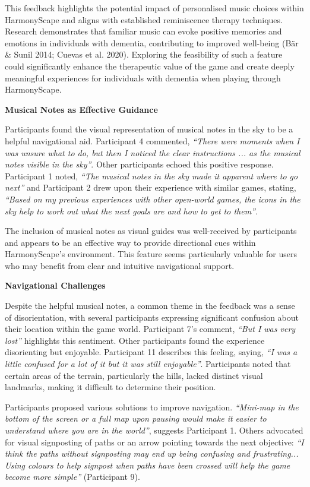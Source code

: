 \documentclass{l4proj}
\begin{document}
This feedback highlights the potential impact of personalised music choices within HarmonyScape and aligns with established reminiscence therapy techniques. Research demonstrates that familiar music can evoke positive memories and emotions in individuals with dementia, contributing to improved well-being (Bär \& Sunil 2014; Cuevas et al. 2020). Exploring the feasibility of such a feature could significantly enhance the therapeutic value of the game and create deeply meaningful experiences for individuals with dementia when playing through HarmonyScape.
\newline

\textbf{Musical Notes as Effective Guidance}

Participants found the visual representation of musical notes in the sky to be a helpful navigational aid. Participant 4 commented, \emph{“There were moments when I was unsure what to do, but then I noticed the clear instructions ... as the musical notes visible in the sky”}. Other participants echoed this positive response. Participant 1 noted, \emph{“The musical notes in the sky made it apparent where to go next”} and Participant 2 drew upon their experience with similar games, stating, \emph{“Based on my previous experiences with other open-world games, the icons in the sky help to work out what the next goals are and how to get to them”}.

The inclusion of musical notes as visual guides was well-received by participants and appears to be an effective way to provide directional cues within HarmonyScape's environment. This feature seems particularly valuable for users who may benefit from clear and intuitive navigational support.
\newline

\textbf{Navigational Challenges}

Despite the helpful musical notes, a common theme in the feedback was a sense of disorientation, with several participants expressing significant confusion about their location within the game world. Participant 7's comment, \emph{“But I was very lost”} highlights this sentiment. Other participants found the experience disorienting but enjoyable. Participant 11 describes this feeling, saying, \emph{“I was a little confused for a lot of it but it was still enjoyable”}. Participants noted that certain areas of the terrain, particularly the hills, lacked distinct visual landmarks, making it difficult to determine their position. 

Participants proposed various solutions to improve navigation. \emph{“Mini-map in the bottom of the screen or a full map upon pausing would make it easier to understand where you are in the world”}, suggests Participant 1. Others advocated for visual signposting of paths or an arrow pointing towards the next objective: \emph{“I think the paths without signposting may end up being confusing and frustrating... Using colours to help signpost when paths have been crossed will help the game become more simple”} (Participant 9).
\end{document}
